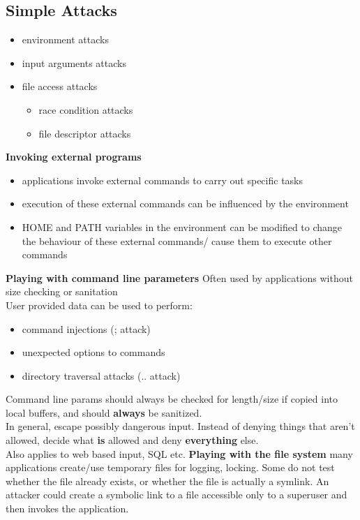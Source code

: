 \documentclass{article}
\begin{document}
\subsection{Simple Attacks}
\begin{itemize}
    \item environment attacks
    \item input arguments attacks
    \item file access attacks
    \begin{itemize}
        \item race condition attacks
        \item file descriptor attacks
    \end{itemize}
\end{itemize}
\textbf{Invoking external programs}
\begin{itemize}
    \item applications invoke external commands to carry out specific tasks
    \item execution of these external commands can be influenced by the environment
    \item HOME and PATH variables in the environment can be modified to change the behaviour of these external commands/ cause them to execute other commands
\end{itemize}
\textbf{Playing with command line parameters}
Often used by applications without size checking or sanitation
\\User provided data can be used to perform:
\begin{itemize}
    \item command injections (; attack)
    \item unexpected options to commands
    \item directory traversal attacks (.. attack)
\end{itemize}
Command line params should always be checked for length/size if copied into local buffers, and should \textbf{always} be sanitized. 
\\In general, escape possibly dangerous input. Instead of denying things that aren't allowed, decide what \textbf{is} allowed and deny \textbf{everything} else.
\\Also applies to web based input, SQL etc.
\textbf{Playing with the file system}
many applications create/use temporary files for logging, locking. Some do not test whether the file already exists, or whether the file is actually a symlink. An attacker could create a symbolic link to a file accessible only to a superuser and then invokes the application.
\end{document}

